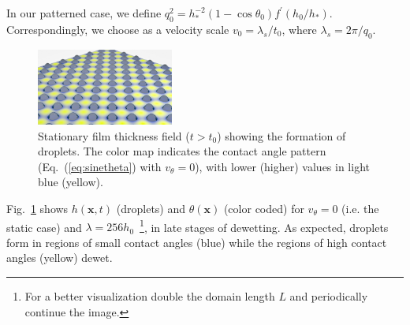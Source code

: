 \documentclass[amsmath,amssymb,showpacs,prf,superscriptaddress, longbibliography]{revtex4-1} %
\begin{document}
In our patterned case, we define 
  $q_0^2=h_{\ast}^{-2}(1-\cos\theta_0)f^{\prime}(h_0/h_{\ast})$. Correspondingly, we choose as a velocity scale $v_0 = \lambda_s/t_0$, where
$\lambda_s = 2\pi/q_0$.
\begin{figure}
    \centering
    \includegraphics[width=0.4\textwidth]{Figure_1.png}
    \caption{Stationary film thickness field ($t>t_0$) showing the formation of droplets. The color map indicates the contact angle pattern 
    (Eq.~(\ref{eq:sinetheta}) with $v_{\theta}=0$), with lower (higher) values in light blue (yellow).
    }
    \label{fig:handtheta}
\end{figure}
Fig.~\ref{fig:handtheta} shows $h(\mathbf{x},t)$ (droplets) and $\theta(\mathbf{x})$ (color coded) for $v_{\theta} = 0$ (i.e. the static case) and $\lambda = 256 h_0$~\footnote{For a better visualization double the domain length $L$ and periodically continue the image.}, in late stages of dewetting.
As expected, droplets form in regions of small contact angles (blue) while the regions of high contact angles (yellow) dewet.
\end{document}
